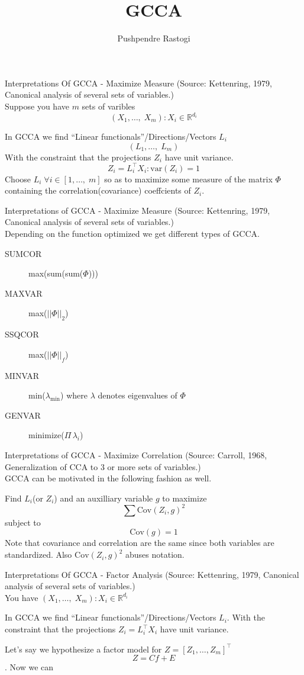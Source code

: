 \documentclass[compress]{beamer}
\title[Representation Learning]{GCCA}
\author[]{Pushpendre Rastogi}
\date[]{}
\newcommand{\fcite}[1]{{\tiny(Source: #1)}\\}
\newcommand{\Cov}{\textrm{Cov}}
\begin{document}
\frame{\titlepage}

\begin{frame}{Interpretations Of GCCA - Maximize Measure}
  \fcite{Kettenring, 1979, Canonical analysis of several sets of variables.}
    
  Suppose you have $m$ sets of varibles
  $$(X_1, \ldots, \; X_m) : X_i \in \mathbb{R}^{d_i}$$

  In GCCA we find ``Linear functionals''/Directions/Vectors $L_i$
  $$(L_1,  \ldots, \; L_m)$$
  With the constraint that the projections $Z_i$ have unit variance.
  $$Z_i = L_i^\top X_i : \textrm{var}(Z_i) = 1$$
  Choose $L_i \; \forall i \in [1, \ldots, \; m]$ so as to
  maximize some measure of the matrix $\Phi$ containing the correlation(covariance)
  coeffcients of $Z_i$.
\end{frame}

\begin{frame}{Interpretations of GCCA - Maximize Measure}
    \fcite{Kettenring, 1979, Canonical analysis of several sets of
      variables.}
    
   Depending on the function optimized we get  different types of GCCA.
  \begin{description}
  \item[SUMCOR] max(sum(sum($\Phi$)))
  \item [MAXVAR] max($||\Phi||_2$)
  \item [SSQCOR] max($||\Phi||_f$)
  \item [MINVAR] min($\lambda_{\min}$) where $\lambda$
    denotes eigenvalues of $\Phi$
  \item [GENVAR] minimize($\Pi \, \lambda_i$)
  \end{description}
  
\end{frame}

\begin{frame}{Interpretations of GCCA - Maximize Correlation}
  \fcite{Carroll, 1968, Generalization of CCA to 3 or more sets of
    variables.}
  GCCA can be motivated in the following fashion as well.

  Find $L_i$(or $Z_i$) and an auxilliary variable $g$ to maximize
  $$\sum \Cov(Z_i, g)^2$$
  subject to $$\Cov(g) = 1$$
  Note that covariance and correlation are the same since both
  variables are standardized. Also $\Cov(Z_i, g)^2$ abuses notation.
\end{frame}

\begin{frame}{Interpretations Of GCCA - Factor Analysis}
  \fcite{Kettenring, 1979, Canonical analysis of several sets of variables.}
    
  You have $(X_1, \ldots, \; X_m) : X_i \in \mathbb{R}^{d_i}$

  In GCCA we find ``Linear functionals''/Directions/Vectors $L_i$.
  With the constraint that the projections $Z_i = L_i^\top X_i$ have
  unit variance.

  Let's say we hypothesize a factor model for $Z = [Z_1, \ldots, Z_m ]^\top$
  $$Z = C f + E$$. Now we can 

\end{frame}
\end{document}
